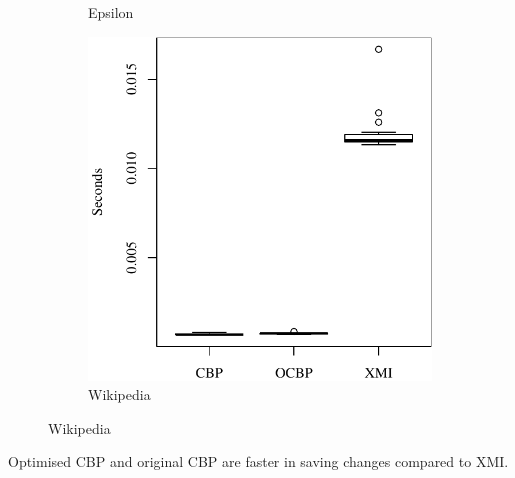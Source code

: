 \documentclass{beamer}
\begin{document}
\begin{frame}[fragile]
\begin{figure}[t]
\begin{subfigure}{0.325\textwidth}
        \caption{Epsilon}
        \label{fig:save_time_epsilon}
    \end{subfigure}
    \hfill
    \begin{subfigure}{0.325\textwidth}
        \centering
        \includegraphics[width=\linewidth]{save_time_wikipedia}
        \caption{Wikipedia}
        \label{fig:save_time_wikipedia}
    \end{subfigure}
    \label{fig:savetime}
\end{figure}
Optimised CBP and original CBP are faster in saving changes compared to XMI.
\end{frame}
\end{document}
